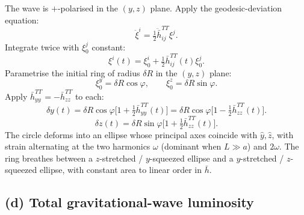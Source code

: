 \documentclass[11pt]{article}
\begin{document}
The wave is $+$-polarised in the $(y,z)$ plane. Apply the geodesic-deviation equation:
\[
\ddot\xi^i=\tfrac12 \ddot{\bar h}^{TT}_{ij}\xi^j.
\]
Integrate twice with $\xi^j_0$ constant:
\[
\xi^i(t)=\xi^i_0+\tfrac12 \bar h^{TT}_{ij}(t)\xi^j_0.
\]
Parametrise the initial ring of radius $\delta R$ in the $(y,z)$ plane:
\[
\xi^y_0=\delta R\cos\varphi,\qquad \xi^z_0=\delta R\sin\varphi.
\]
Apply $\bar h^{TT}_{yy}=-\bar h^{TT}_{zz}$ to each:
\[
\delta y(t)=\delta R\cos\varphi\bigl[1+\tfrac12 \bar h^{TT}_{yy}(t)\bigr]=\delta R\cos\varphi\bigl[1-\tfrac12 \bar h^{TT}_{zz}(t)\bigr].
\]
\[
\delta z(t)=\delta R\sin\varphi\bigl[1+\tfrac12 \bar h^{TT}_{zz}(t)\bigr].
\]
The circle deforms into an ellipse whose principal axes coincide with $\hat y,\hat z$, with strain alternating at the two harmonics $\omega$ (dominant when $L\gg a$) and $2\omega$. The ring breathes between a $z$-stretched / $y$-squeezed ellipse and a $y$-stretched / $z$-squeezed ellipse, with constant area to linear order in $\bar h$.

\begin{center}
\end{center}

\subsection*{(d) Total gravitational-wave luminosity}
\end{document}
